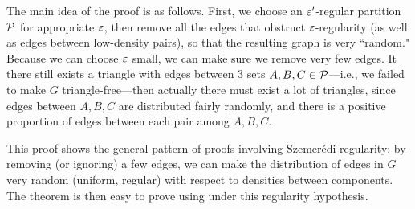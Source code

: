 The main idea of the proof is as follows. First, we choose an $\ep'$-regular partition $\cal P$ for appropriate $\ep$, then remove all the edges that obstruct $\ep$-regularity (as well as edges between low-density pairs), so that the resulting graph is very ``random." Because we can choose $\ep$ small, we can make sure we remove very few edges. It there still exists a triangle with edges between 3 sets $A,B,C\in \cal P$---i.e., we failed to make $G$ triangle-free---then actually there must exist a lot of triangles, since edges between $A,B,C$ are distributed fairly randomly, and there is a positive proportion of edges between each pair among $A,B,C$.

This proof shows the general pattern of proofs involving Szemer\'edi regularity: by removing (or ignoring) a few edges, we can make the distribution of edges in $G$ very random (uniform, regular) with respect to densities between components. The theorem is then easy to prove using under this regularity hypothesis.

